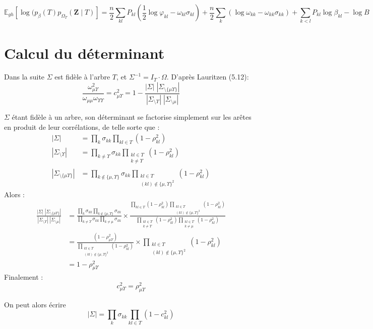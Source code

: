 \documentclass[11pt,a4paper]{article}
\newcommand{\Zbf}{\boldsymbol{Z}}
\newcommand{\Esp}{\mathds{E}}
\begin{document}
 $$\boxed{\Esp_{gh} [\log (p_\beta(T)p_{\Omega_T}(\Zbf\mid T) ]  =  \frac{n}{2} \sum_{kl} P_{kl} ( \frac{1}{2} \log \varphi_{kl} -\omega_{kl} \sigma_{kl} ) + \frac{n}{2} \sum_k (\log \omega_{kk} - \omega_{kk} \sigma_{kk}) +\sum_{k<l} P_{kl} \log  \beta_{kl} - \log B }$$
\newpage

 \appendix
\section{Calcul du déterminant}
Dans la suite $\Sigma$ est fidèle à l'arbre $T$, et $\Sigma^{-1} = I_T\cdot \Omega$. D'après Lauritzen (5.12):
$$\frac{\omega_{\mu\Upsilon}^2}{\omega_{\mu\mu}\omega_{\Upsilon\Upsilon}} = c_{\mu\Upsilon}^2 = 1-\frac{|\Sigma|\;|\Sigma_{\setminus \{\mu\Upsilon\}}|}{|\Sigma_{\setminus\Upsilon}|\;|\Sigma_{\setminus \mu}|} $$

$\Sigma$ étant fidèle à un arbre, son déterminant se factorise simplement sur les arêtes en produit de leur corrélations, de telle sorte que :
\begin{align*}
    |\Sigma| &= \prod_k \sigma_{kk} \prod_{kl\in T} (1-\rho_{kl}^2)\\
    |\Sigma_{\setminus\Upsilon}| &= \prod_{k \neq \Upsilon} \sigma_{kk} \prod_{\substack{kl\in T \\ k \neq \Upsilon}} (1-\rho_{kl}^2)\\
    |\Sigma_{\setminus \{\mu\Upsilon\}}| &= \prod_{k\notin \{\mu, \Upsilon\}} \sigma_{kk} \prod_{\substack{kl\in T\\ (kl) \notin \{\mu, \Upsilon\}^2 }} (1-\rho_{kl}^2)
\end{align*}
Alors :
\begin{align*}
    \frac{|\Sigma|\;|\Sigma_{\setminus \{\mu\Upsilon\}}|}{|\Sigma_{\setminus\Upsilon}|\;|\Sigma_{\setminus \mu}|} &=\frac{\prod_k \sigma_{kk} \prod_{k\notin \{\mu, \Upsilon\}} \sigma_{kk}}{\prod_{k \neq \Upsilon} \sigma_{kk} \prod_{k \neq \mu} \sigma_{kk}} \times \frac{ \prod_{kl\in T} (1-\rho_{kl}^2)\prod_{\substack{kl\in T\\ (kl) \notin \{\mu, \Upsilon\}^2 }} (1-\rho_{kl}^2)}{\prod_{\substack{kl\in T \\ k \neq \Upsilon}} (1-\rho_{kl}^2)\prod_{\substack{kl\in T \\ k \neq \mu}} (1-\rho_{kl}^2)} \\
    &=\frac{(1-\rho_{\mu\Upsilon}^2)}{\prod_{\substack{kl\in T\\ (kl) \notin \{\mu, \Upsilon\}^2 }} (1-\rho_{kl}^2)} \times \prod_{\substack{kl\in T\\ (kl) \notin \{\mu, \Upsilon\}^2 }} (1-\rho_{kl}^2)\\
     &=1-\rho_{\mu\Upsilon}^2
\end{align*}
Finalement : 
$$\boxed{c_{\mu\Upsilon}^2 = \rho_{\mu\Upsilon}^2}$$

On peut alors écrire
$$ |\Sigma| = \prod_k \sigma_{kk} \prod_{kl \in T} (1-c_{kl}^2)$$
\end{document}
